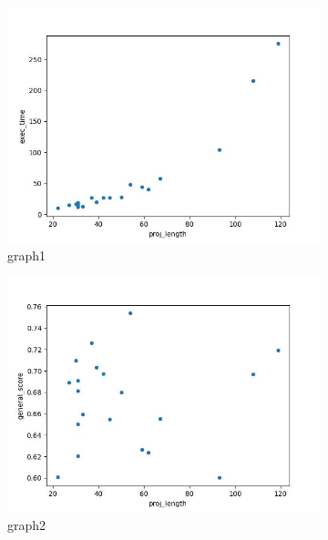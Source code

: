 \documentclass[12pt,a4paper]{article}
\begin{document}
\begin{figure}[H]
	\begin{subfigure}[t]{0.5\linewidth}
		\centering
		\includegraphics[width=1\linewidth]{plots/lenVStime.jpg}
		\caption{graph1}
		\label{sub:graph1}
	\end{subfigure}
	\begin{subfigure}[t]{0.5\linewidth}
		\centering
		\includegraphics[width=1\linewidth]{plots/lenVSgen.jpg}
		\caption{graph2}
		\label{sub:graph2}	
	\end{subfigure}
	\begin{subfigure}[t]{0.5\linewidth}
		\centering

\end{subfigure}
\end{figure}
\end{document}
